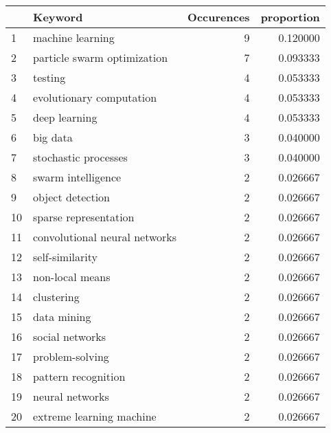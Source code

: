 \begin{tabular}{llrr}
\toprule
{} &                                         Keyword &  Occurences &  proportion \\
\midrule
1  &                                machine learning &           9 &    0.120000 \\
2  &                     particle swarm optimization &           7 &    0.093333 \\
3  &                                         testing &           4 &    0.053333 \\
4  &                        evolutionary computation &           4 &    0.053333 \\
5  &                                   deep learning &           4 &    0.053333 \\
6  &                                        big data &           3 &    0.040000 \\
7  &                            stochastic processes &           3 &    0.040000 \\
8  &                              swarm intelligence &           2 &    0.026667 \\
9  &                                object detection &           2 &    0.026667 \\
10 &                           sparse representation &           2 &    0.026667 \\
11 &                   convolutional neural networks &           2 &    0.026667 \\
12 &                                 self-similarity &           2 &    0.026667 \\
13 &                                 non-local means &           2 &    0.026667 \\
14 &                                      clustering &           2 &    0.026667 \\
15 &                                     data mining &           2 &    0.026667 \\
16 &                                 social networks &           2 &    0.026667 \\
17 &                                 problem-solving &           2 &    0.026667 \\
18 &                             pattern recognition &           2 &    0.026667 \\
19 &                                 neural networks &           2 &    0.026667 \\
20 &                        extreme learning machine &           2 &    0.026667 \\

\end{tabular}
